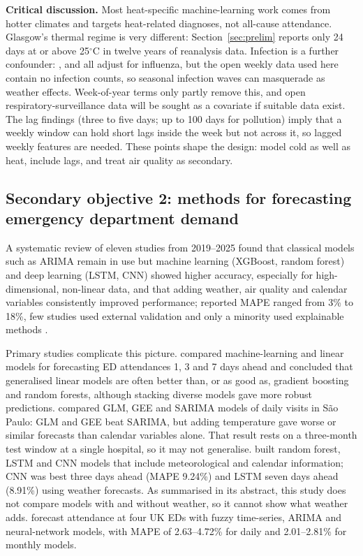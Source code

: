 \documentclass[12pt]{article}
\begin{document}
\textbf{Critical discussion.} Most heat-specific machine-learning work comes from hotter climates and targets heat-related diagnoses, not all-cause attendance. Glasgow's thermal regime is very different: Section~\ref{sec:prelim} reports only 24 days at or above 25$^\circ$C in twelve years of reanalysis data. Infection is a further confounder: \textcite{kovats2004}, \textcite{corcuerahotz2020} and \textcite{murtas2022} all adjust for influenza, but the open weekly data used here contain no infection counts, so seasonal infection waves can masquerade as weather effects. Week-of-year terms only partly remove this, and open respiratory-surveillance data will be sought as a covariate if suitable data exist. The lag findings (three to five days; up to 100 days for pollution) imply that a weekly window can hold short lags inside the week but not across it, so lagged weekly features are needed. These points shape the design: model cold as well as heat, include lags, and treat air quality as secondary.

\subsection{Secondary objective 2: methods for forecasting emergency department demand}
A systematic review of eleven studies from 2019--2025 found that classical models such as ARIMA remain in use but machine learning (XGBoost, random forest) and deep learning (LSTM, CNN) showed higher accuracy, especially for high-dimensional, non-linear data, and that adding weather, air quality and calendar variables consistently improved performance; reported MAPE ranged from 3\% to 18\%, few studies used external validation and only a minority used explainable methods \parencite{blanco2026}.

Primary studies complicate this picture. \textcite{vollmer2021} compared machine-learning and linear models for forecasting ED attendances 1, 3 and 7 days ahead and concluded that generalised linear models are often better than, or as good as, gradient boosting and random forests, although stacking diverse models gave more robust predictions. \textcite{marcilio2013} compared GLM, GEE and SARIMA models of daily visits in S\~ao Paulo: GLM and GEE beat SARIMA, but adding temperature gave worse or similar forecasts than calendar variables alone. That result rests on a three-month test window at a single hospital, so it may not generalise. \textcite{sudarshan2021} built random forest, LSTM and CNN models that include meteorological and calendar information; CNN was best three days ahead (MAPE 9.24\%) and LSTM seven days ahead (8.91\%) using weather forecasts. As summarised in its abstract, this study does not compare models with and without weather, so it cannot show what weather adds. \textcite{jilani2019} forecast attendance at four UK EDs with fuzzy time-series, ARIMA and neural-network models, with MAPE of 2.63--4.72\% for daily and 2.01--2.81\% for monthly models.
\end{document}
